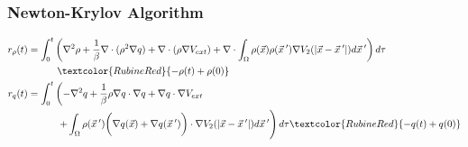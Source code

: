 \documentclass[aspectratio=169,xcolor=dvipsnames]{beamer}
\begin{document}
\begin{frame}
	\frametitle{Newton-Krylov Algorithm}

	\begin{align*}
	r_\rho(t) &  = \int_0^t \left(\nabla^2 \rho + \frac{1}{\beta}\nabla \cdot (\rho^2 \nabla q) + \nabla \cdot \left(\rho \nabla V_{ext}\right)
	+ \nabla \cdot \int_\Omega \rho(\vec{x}) \rho(\vec{x}\hspace{0.2em}') \nabla V_2(|\vec{x}-\vec{x}\hspace{0.2em}'|)d\vec{x}\hspace{0.2em}' \right) d \tau\\
	& \qquad \quad  \textcolor{RubineRed}{- \rho(t) + \rho(0) }\\
	r_q(t) &  = \int_0^t \left(-\nabla^2 q + \frac{1}{\beta}\rho\nabla q \cdot   \nabla q  + \nabla q \cdot \nabla V_{ext} \right.\\
	&\qquad \quad	\left. + \int_\Omega \rho(\vec{x}\hspace{0.2em}') \bigg(\nabla q(\vec{x}) + \nabla q(\vec{x}\hspace{0.2em}')\bigg)\cdot  \nabla V_2(|\vec{x}-\vec{x}\hspace{0.2em}'|)d\vec{x}\hspace{0.2em}' \right) d \tau \textcolor{RubineRed}{ - q(t) + q(0)}
\end{align*}

\end{frame}
\end{document}
